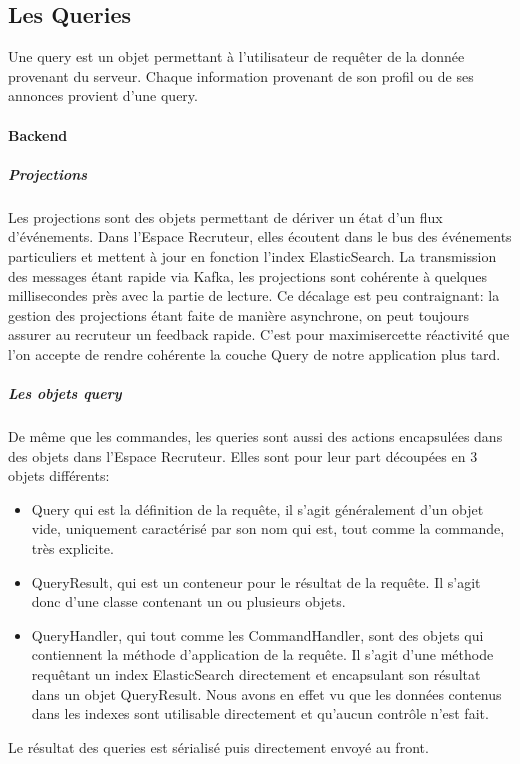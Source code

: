 \subsection{Les Queries}
\label{sub:Les Queries}
Une query est un objet permettant à l'utilisateur de requêter de la donnée provenant du serveur.
Chaque information provenant de son profil ou de ses annonces provient d'une query.

\paragraph{Backend}
\label{par:Backend}
\subparagraph{Projections}
\label{subp:Projections}
Les projections sont des objets permettant de dériver un état d'un flux d'événements.
Dans l'Espace Recruteur, elles écoutent dans le bus des événements particuliers et mettent à jour en fonction l'index ElasticSearch.
La transmission des messages étant rapide via Kafka, les projections sont cohérente à quelques millisecondes près avec la partie de lecture.
Ce décalage est peu contraignant: la gestion des projections étant faite de manière asynchrone, on peut toujours assurer au recruteur un feedback rapide.
C'est pour maximisercette réactivité que l'on accepte de rendre cohérente la couche Query de notre application plus tard.
\subparagraph{Les objets query}
\label{subp:Les objets query}
De même que les commandes, les queries sont aussi des actions encapsulées dans des objets dans l'Espace Recruteur.
Elles sont pour leur part découpées en 3 objets différents:
\begin{itemize}
  \item Query qui est la définition de la requête, il s'agit généralement d'un objet vide, uniquement caractérisé par son nom qui est, tout comme la commande, très explicite.
  \item QueryResult, qui est un conteneur pour le résultat de la requête.
  Il s'agit donc d'une classe contenant un ou plusieurs objets.
  \item QueryHandler, qui tout comme les CommandHandler, sont des objets qui contiennent la méthode d'application de la requête.
  Il s'agit d'une méthode requêtant un index ElasticSearch directement et encapsulant son résultat dans un objet QueryResult.
  Nous avons en effet vu que les données contenus dans les indexes sont utilisable directement et qu'aucun contrôle n'est fait.
\end{itemize}
Le résultat des queries est sérialisé puis directement envoyé au front.
